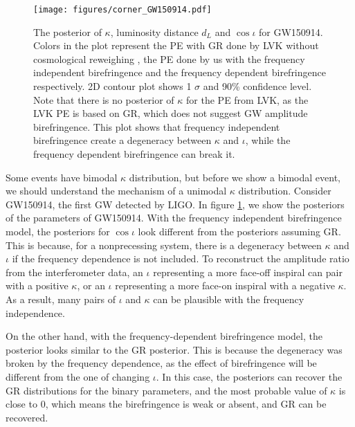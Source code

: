 \documentclass[reprint,amsmath,amssymb,aps,twocolumn]{aastex631}
\begin{document}
\begin{figure}[h]
    \texttt{[image: figures/corner\_GW150914.pdf]}
    \caption{
        The posterior of $\kappa$, luminosity distance $d_L$ and $\cos{\iota}$ for GW150914.
        Colors in the plot represent the PE with GR done by LVK without cosmological reweighing \citep{GWTC-2.1, GWTC-3}, the PE done by us with the frequency independent birefringence and the frequency dependent birefringence respectively.
        2D contour plot shows 1 $\sigma$ and 90\% confidence level.
        Note that there is no posterior of $\kappa$ for the PE from LVK, as the LVK PE is based on GR, which does not suggest GW amplitude birefringence.
        This plot shows that frequency independent birefringence create a degeneracy between $\kappa$ and $\iota$, while the frequency dependent birefringence can break it.
    }
    \label{fig:corner_GW150914}
\end{figure}

Some events have bimodal $\kappa$ distribution, but before we show a bimodal event, we should understand the mechanism of a unimodal $\kappa$ distribution.
Consider GW150914, the first GW detected by LIGO.
In figure \ref{fig:corner_GW150914}, we show the posteriors of the parameters of GW150914.
With the frequency independent birefringence model, the posteriors for $\cos\iota$ look different from the posteriors assuming GR.
This is because, for a nonprecessing system, there is a degeneracy between $\kappa$ and $\iota$ if the frequency dependence is not included.
To reconstruct the amplitude ratio from the interferometer data, an $\iota$ representing a more face-off inspiral can pair with a positive $\kappa$, or an $\iota$ representing a more face-on inspiral with a negative $\kappa$.
As a result, many pairs of $\iota$ and $\kappa$ can be plausible with the frequency independence.

On the other hand, with the frequency-dependent birefringence model, the posterior looks similar to the GR posterior.
This is because the degeneracy was broken by the frequency dependence, as the effect of birefringence will be different from the one of changing $\iota$.
In this case, the posteriors can recover the GR distributions for the binary parameters,
and the most probable value of $\kappa$ is close to $0$, which means the birefringence is weak or absent, and GR can be recovered.

\end{document}
